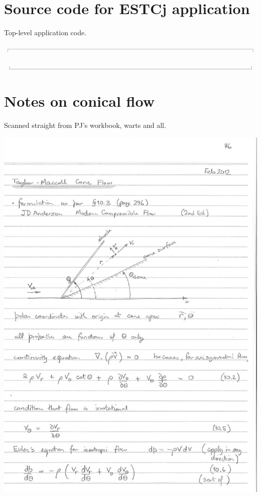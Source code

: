 \documentclass[10pt,a4paper]{article}
\newcommand{\topbar}{\ensuremath{
    \rule{0.1mm}{2.0mm} \rule[2.0mm]{159.5mm}{0.1mm} \rule{0.1mm}{2.0mm}
}}
\newcommand{\bottombar}{\ensuremath{
    \rule{0.1mm}{2.0mm} \rule{159.5mm}{0.1mm} \rule{0.1mm}{2.0mm}
}}
\begin{document}
\newpage
\section{Source code for ESTCj application}
\label{estcj-py}
%
Top-level application code.

\noindent\topbar

\bottombar

\newpage
\section{Notes on conical flow}
\label{pj-notes-cone-flow}
%
Scanned straight from PJ's workbook, warts and all.

\begin{center}
\includegraphics[width=\textwidth]{../figs/pj-workbook-page-76.png}
\end{center}
\end{document}
